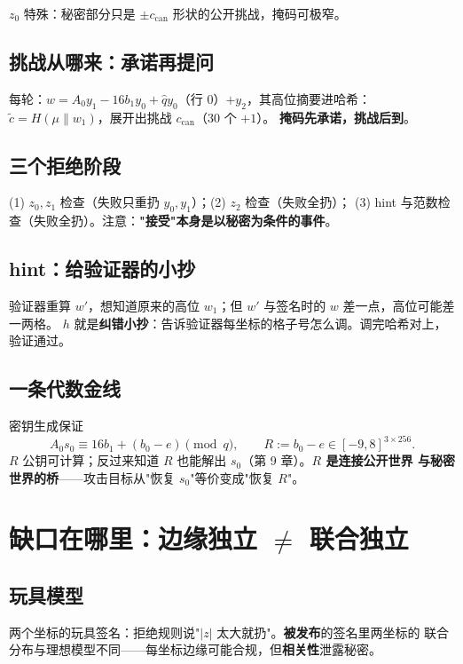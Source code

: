 \documentclass[11pt,a4paper]{ctexart}
\begin{document}
$z_0$ 特殊：秘密部分只是 $\pm c_{\mathrm{can}}$ 形状的公开挑战，掩码可极窄。

\subsection{挑战从哪来：承诺再提问}

每轮：$w = A_0 y_1 - 16 b_1 y_0 + \hat q y_0$（行 0）$+ y_2$，其高位摘要进哈希：
$\tilde c = H(\mu\|w_1)$，展开出挑战 $c_{\mathrm{can}}$（30 个 $+1$）。
\textbf{掩码先承诺，挑战后到}。

\subsection{三个拒绝阶段}

(1) $z_0,z_1$ 检查（失败只重扔 $y_0,y_1$）；(2) $z_2$ 检查（失败全扔）；
(3) hint 与范数检查（失败全扔）。注意：\textbf{"接受"本身是以秘密为条件的事件}。

\subsection{hint：给验证器的小抄}

验证器重算 $w'$，想知道原来的高位 $w_1$；但 $w'$ 与签名时的 $w$ 差一点，高位可能差一两格。
$h$ 就是\textbf{纠错小抄}：告诉验证器每坐标的格子号怎么调。调完哈希对上，验证通过。

\subsection{一条代数金线}

密钥生成保证
\begin{equation}
A_0 s_0 \equiv 16 b_1 + (b_0 - e) \pmod q,
\qquad R := b_0 - e \in [-9,8]^{3\times256}.
\label{eq:primer-R}
\end{equation}
$R$ 公钥可计算；反过来知道 $R$ 也能解出 $s_0$（第 9 章）。\textbf{$R$ 是连接公开世界
与秘密世界的桥}——攻击目标从"恢复 $s_0$"等价变成"恢复 $R$"。

\section{缺口在哪里：边缘独立 $\ne$ 联合独立}

\subsection{玩具模型}

两个坐标的玩具签名：拒绝规则说"$|z|$ 太大就扔"。\textbf{被发布}的签名里两坐标的
联合分布与理想模型不同——每坐标边缘可能合规，但\textbf{相关性}泄露秘密。
\end{document}
